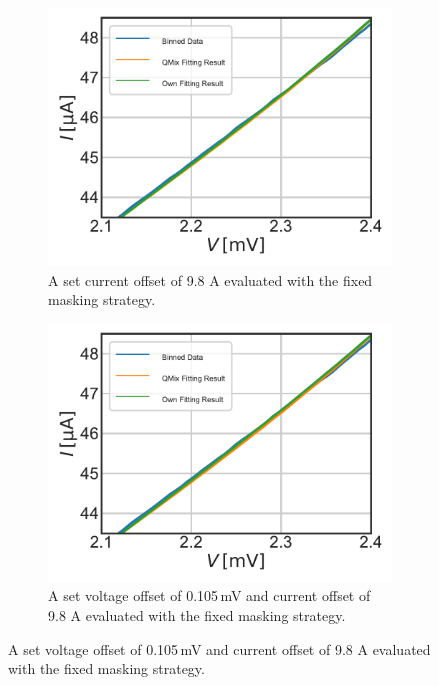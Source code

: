 \documentclass[]{article}
\begin{document}
\begin{figure}
	\centering              
	\begin{subfigure}[t]{0.49\textwidth}
		\centering
		\includegraphics[width=\linewidth]{./../Mixer_Unit_Test/2020_01_16_IVOffsetFixedMask_9.8uA/Comparison_with_Johns_Embedding_Impedance.pdf}
		\caption{A set current offset of 9.8 \textmu A evaluated with the fixed masking strategy.}
	\end{subfigure}
	\begin{subfigure}[t]{0.49\textwidth}
		\centering
		\includegraphics[width=\linewidth]{./../Mixer_Unit_Test/2020_01_16_IVOffsetFixedMask_0.105mV9.8uA/Comparison_with_Johns_Embedding_Impedance.pdf}
		\caption{A set voltage offset of 0.105\,mV and current offset of 9.8 \textmu A evaluated with the fixed masking strategy.}

\end{subfigure}
\end{figure}
\end{document}
